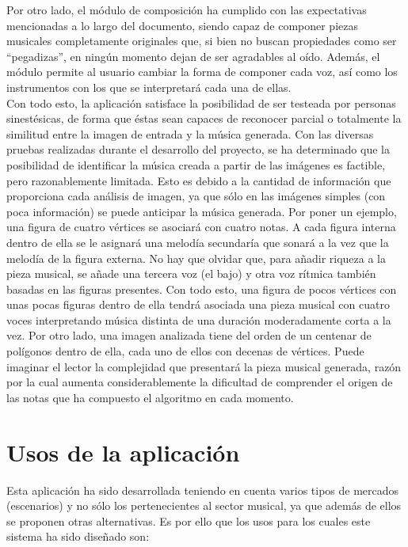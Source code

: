 Por otro lado, el módulo de composición ha cumplido con las expectativas mencionadas a lo largo del documento, siendo capaz de componer piezas musicales completamente originales que, si bien no buscan propiedades como ser ``pegadizas'', en ningún momento dejan de ser agradables al oído. Además, el módulo permite al usuario cambiar la forma de componer cada voz, así como los instrumentos con los que se interpretará cada una de ellas.\\

Con todo esto, la aplicación satisface la posibilidad de ser testeada por personas sinestésicas, de forma que éstas sean capaces de reconocer parcial o totalmente la similitud entre la imagen de entrada y la música generada. Con las diversas pruebas realizadas durante el desarrollo del proyecto, se ha determinado que la posibilidad de identificar la música creada a partir de las imágenes es factible, pero razonablemente limitada. Esto es debido a la cantidad de información que proporciona cada análisis de imagen, ya que sólo en las imágenes simples (con poca información) se puede anticipar la música generada. Por poner un ejemplo, una figura de cuatro vértices se asociará con cuatro notas. A cada figura interna dentro de ella se le asignará una melodía secundaría que sonará a la vez que la melodía de la figura externa. No hay que olvidar que, para añadir riqueza a la pieza musical, se añade una tercera voz (el bajo) y otra voz rítmica también basadas en las figuras presentes. Con todo esto, una figura de pocos vértices con unas pocas figuras dentro de ella tendrá asociada una pieza musical con cuatro voces interpretando música distinta de una duración moderadamente corta a la vez. Por otro lado, una imagen analizada tiene del orden de un centenar de polígonos dentro de ella, cada uno de ellos con decenas de vértices. Puede imaginar el lector la complejidad que presentará la pieza musical generada, razón por la cual aumenta considerablemente la dificultad de comprender el origen de las notas que ha compuesto el algoritmo en cada momento.\\


\section{Usos de la aplicación}
\label{sec:usos}

Esta aplicación ha sido desarrollada teniendo en cuenta varios tipos de mercados (escenarios) y no sólo los pertenecientes al sector musical, ya que además de ellos se proponen otras alternativas. Es por ello que los usos para los cuales este sistema ha sido diseñado son:

